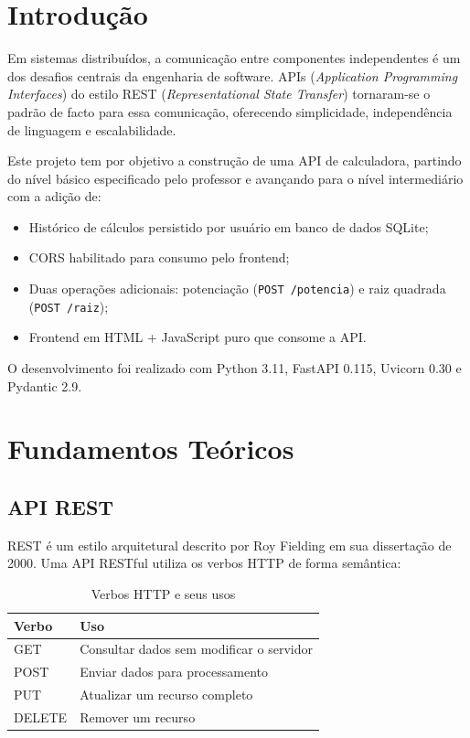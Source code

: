 \documentclass[12pt, a4paper]{article}
\begin{document}
\newpage
\tableofcontents
\newpage

\section{Introdução}

Em sistemas distribuídos, a comunicação entre componentes independentes é um dos desafios centrais da engenharia de software. APIs (\textit{Application Programming Interfaces}) do estilo REST (\textit{Representational State Transfer}) tornaram-se o padrão de facto para essa comunicação, oferecendo simplicidade, independência de linguagem e escalabilidade.

Este projeto tem por objetivo a construção de uma API de calculadora, partindo do nível básico especificado pelo professor e avançando para o nível intermediário com a adição de:

\begin{itemize}[leftmargin=*]
  \item Histórico de cálculos persistido por usuário em banco de dados SQLite;
  \item CORS habilitado para consumo pelo frontend;
  \item Duas operações adicionais: potenciação (\texttt{POST /potencia}) e raiz quadrada (\texttt{POST /raiz});
  \item Frontend em HTML + JavaScript puro que consome a API.
\end{itemize}

O desenvolvimento foi realizado com Python 3.11, FastAPI 0.115, Uvicorn 0.30 e Pydantic 2.9.

\section{Fundamentos Teóricos}

\subsection{API REST}

REST é um estilo arquitetural descrito por Roy Fielding em sua dissertação de 2000. Uma API RESTful utiliza os verbos HTTP de forma semântica:

\begin{table}[H]
  \centering
  \caption{Verbos HTTP e seus usos}
  \begin{tabularx}{\linewidth}{lX}
    \toprule
    \textbf{Verbo} & \textbf{Uso} \\
    \midrule
    GET    & Consultar dados sem modificar o servidor \\
    POST   & Enviar dados para processamento \\
    PUT    & Atualizar um recurso completo \\
    DELETE & Remover um recurso \\
    \bottomrule
  \end{tabularx}
\end{table}
\end{document}
